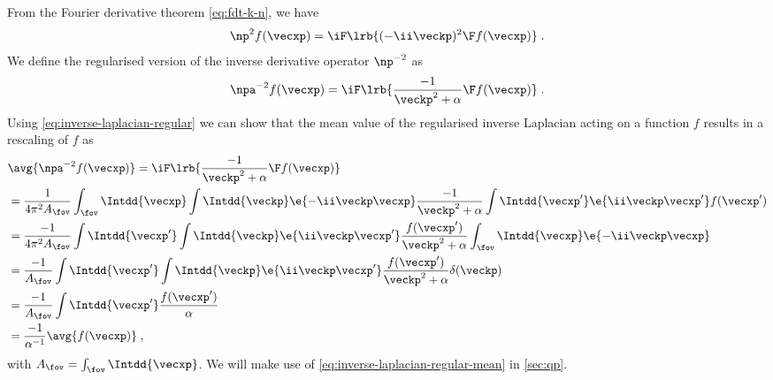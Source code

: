 \documentclass[
twoside,
openright,
titlepage,
numbers=noenddot,
headinclude,
fleqn,
a4paper,
footinclude=true,
cleardoublepage=empty,
abstractoff,
BCOR=5mm,
paper=a4,
fontsize=11pt,
british,ngerman,american,
]{scrreprt}
\begin{document}
From the Fourier derivative theorem \cref{eq:fdt-k-n}, we have
\begin{equation}
  \label{eq:fourier-derivative-n}
  \np^2 f(\vecxp) = \iF\lrb{ (-\ii\veckp)^2 \F f(\vecxp) } \;.
\end{equation}
We define the regularised version of the inverse derivative operator
$\np^{-2}$ as
\begin{equation}
  \label{eq:inverse-laplacian-regular}
  \npa^{-2} f(\vecxp) = 
  \iF\lrb{ \frac{-1}{\veckp^2 + \alpha } \F f(\vecxp) } \;.
\end{equation}
Using \cref{eq:inverse-laplacian-regular} we can show that the mean
value of the regularised inverse Laplacian acting on a function $f$
results in a rescaling of $f$ as
\begin{equation}
  \label{eq:inverse-laplacian-regular-mean}
  \begin{split}
      &\avg{ \npa^{-2} f(\vecxp) }  =   
      \iF\lrb{ \frac{-1}{\veckp^2+\alpha }\F f(\vecxp) }
      \\ & = \frac{1}{4\pi^2 A_\fov }
      \int_\fov\Intdd{\vecxp}
      \int\Intdd{\veckp}\e{-\ii\veckp\vecxp}
      \frac{-1}{\veckp^2+\alpha}
      \int\Intdd{\vecxp'}\e{\ii\veckp\vecxp'} f(\vecxp')
      \\ & = \frac{-1}{4\pi^2A_\fov}
      \int\Intdd{\vecxp'}\int\Intdd{\veckp}
      \e{\ii\veckp\vecxp'} 
      \frac{f(\vecxp')}{\veckp^2+\alpha}
      \int_\fov\Intdd{\vecxp}\e{-\ii\veckp\vecxp}
      \\ & = \frac{-1}{A_\fov}
      \int\Intdd{\vecxp'}\int\Intdd{\veckp}
      \e{\ii\veckp\vecxp'} 
      \frac{f(\vecxp')}{\veckp^2+\alpha}
      \delta(\veckp)
      \\ & = \frac{-1}{A_\fov}
      \int\Intdd{\vecxp'}
      \frac{f(\vecxp')}{\alpha}
      \\ & = \frac{-1}{\alpha^{-1}} \avg{ f(\vecxp) } \;,
  \end{split}
\end{equation}
with $A_\fov=\int_\fov\Intdd{\vecxp}$.  We will make use of
\cref{eq:inverse-laplacian-regular-mean} in \cref{sec:qp}.
\end{document}
